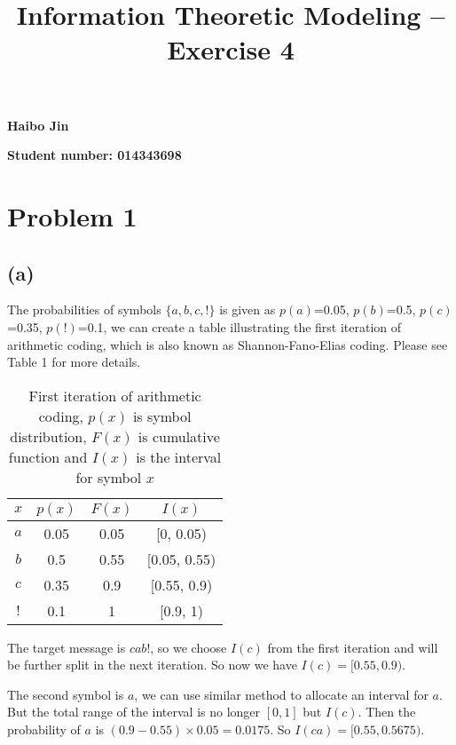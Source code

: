 \documentclass{article}
\title{Information Theoretic Modeling -- Exercise 4}
\date{}
\begin{document}
\maketitle

{\centering \large \textbf{Haibo Jin}}

{\centering \large \textbf{Student number: 014343698}}

\section{Problem 1}

\subsection*{(a)}

The probabilities of symbols $\{a,b,c,!\}$ is given as $p(a)$=0.05, $p(b)$=0.5, $p(c)$=0.35, $p(!)$=0.1, we can create a table illustrating the first iteration of arithmetic coding, which is also known as Shannon-Fano-Elias coding. Please see Table 1 for more details.
 
\begin{table}[h]
\centering
\begin{tabular}{|c | c| c| c|}
\hline
$x$	&$p(x)$	&$F(x)$	&$I(x)$\\
\hline
$a$	&0.05  &0.05  &[0, 0.05)\\
\hline
$b$	&0.5  &0.55  &[0.05, 0.55)\\
\hline
$c$	&0.35  &0.9  &[0.55, 0.9)\\
\hline
$!$	&0.1  &1  &[0.9, 1)\\
\hline
\end{tabular}
\caption{First iteration of arithmetic coding, $p(x)$ is symbol distribution, $F(x)$ is cumulative function and $I(x)$ is the interval for symbol $x$}
\end{table}

The target message is $cab!$, so we choose $I(c)$ from the first iteration and will be further split in the next iteration. So now we have $I(c)=[0.55, 0.9)$.

\vspace{3mm}

The second symbol is $a$, we can use similar method to allocate an interval for $a$. But the total range of the interval is no longer $[0, 1]$ but $I(c)$. Then the probability of $a$ is $(0.9-0.55)\times0.05=0.0175$. So $I(ca)=[0.55, 0.5675)$.

\vspace{3mm}
\end{document}
